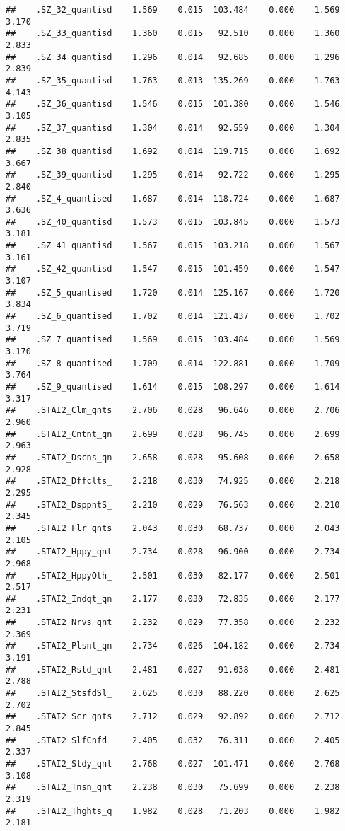 \documentclass[]{article}
\begin{document}
\begin{verbatim}
##    .SZ_32_quantisd    1.569    0.015  103.484    0.000    1.569    3.170
##    .SZ_33_quantisd    1.360    0.015   92.510    0.000    1.360    2.833
##    .SZ_34_quantisd    1.296    0.014   92.685    0.000    1.296    2.839
##    .SZ_35_quantisd    1.763    0.013  135.269    0.000    1.763    4.143
##    .SZ_36_quantisd    1.546    0.015  101.380    0.000    1.546    3.105
##    .SZ_37_quantisd    1.304    0.014   92.559    0.000    1.304    2.835
##    .SZ_38_quantisd    1.692    0.014  119.715    0.000    1.692    3.667
##    .SZ_39_quantisd    1.295    0.014   92.722    0.000    1.295    2.840
##    .SZ_4_quantised    1.687    0.014  118.724    0.000    1.687    3.636
##    .SZ_40_quantisd    1.573    0.015  103.845    0.000    1.573    3.181
##    .SZ_41_quantisd    1.567    0.015  103.218    0.000    1.567    3.161
##    .SZ_42_quantisd    1.547    0.015  101.459    0.000    1.547    3.107
##    .SZ_5_quantised    1.720    0.014  125.167    0.000    1.720    3.834
##    .SZ_6_quantised    1.702    0.014  121.437    0.000    1.702    3.719
##    .SZ_7_quantised    1.569    0.015  103.484    0.000    1.569    3.170
##    .SZ_8_quantised    1.709    0.014  122.881    0.000    1.709    3.764
##    .SZ_9_quantised    1.614    0.015  108.297    0.000    1.614    3.317
##    .STAI2_Clm_qnts    2.706    0.028   96.646    0.000    2.706    2.960
##    .STAI2_Cntnt_qn    2.699    0.028   96.745    0.000    2.699    2.963
##    .STAI2_Dscns_qn    2.658    0.028   95.608    0.000    2.658    2.928
##    .STAI2_Dffclts_    2.218    0.030   74.925    0.000    2.218    2.295
##    .STAI2_DsppntS_    2.210    0.029   76.563    0.000    2.210    2.345
##    .STAI2_Flr_qnts    2.043    0.030   68.737    0.000    2.043    2.105
##    .STAI2_Hppy_qnt    2.734    0.028   96.900    0.000    2.734    2.968
##    .STAI2_HppyOth_    2.501    0.030   82.177    0.000    2.501    2.517
##    .STAI2_Indqt_qn    2.177    0.030   72.835    0.000    2.177    2.231
##    .STAI2_Nrvs_qnt    2.232    0.029   77.358    0.000    2.232    2.369
##    .STAI2_Plsnt_qn    2.734    0.026  104.182    0.000    2.734    3.191
##    .STAI2_Rstd_qnt    2.481    0.027   91.038    0.000    2.481    2.788
##    .STAI2_StsfdSl_    2.625    0.030   88.220    0.000    2.625    2.702
##    .STAI2_Scr_qnts    2.712    0.029   92.892    0.000    2.712    2.845
##    .STAI2_SlfCnfd_    2.405    0.032   76.311    0.000    2.405    2.337
##    .STAI2_Stdy_qnt    2.768    0.027  101.471    0.000    2.768    3.108
##    .STAI2_Tnsn_qnt    2.238    0.030   75.699    0.000    2.238    2.319
##    .STAI2_Thghts_q    1.982    0.028   71.203    0.000    1.982    2.181

\end{verbatim}
\end{document}
